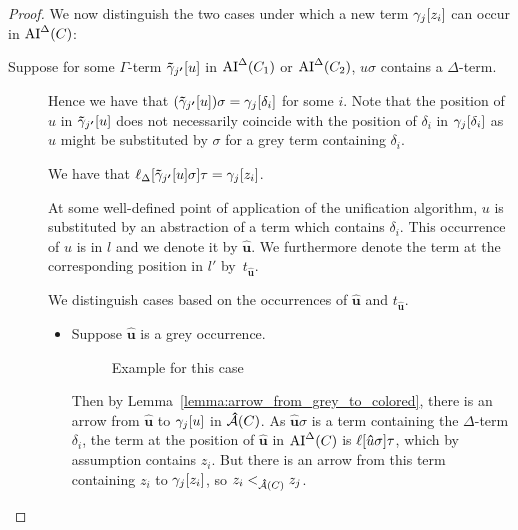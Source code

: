 \documentclass[,%
	paper=a4,%
	DIV10, %
	twoside=false,%
	liststotoc,
	bibtotoc,
	draft=false,%
	numbers=noendperiod
]{scrartcl}
\begin{document}
\begin{proof}
	We now distinguish the two cases under which a new term $\gamma_j[z_i]$ can occur in $\operatorname{AI}^\Delta(C)$:

	\begin{description}
		\item[Suppose for some $\Gamma$-term $\bm\tilde\gamma_{j\bm'}[u]$ in $\operatorname{AI}^\Delta(C_1)$ or $\operatorname{AI}^\Delta(C_2)$, $u\sigma$ contains a $\Delta$-term.]\hfill\nopagebreak

			Hence we have that $(\bm\tilde\gamma_{j\bm'}[u])\sigma = \gamma_j[\delta_i]$ for some $i$.
			Note that the position of $u$ in $\bm\tilde\gamma_{j\bm'}[u]$ does not necessarily coincide with the position of $\delta_i$ in $\gamma_j[\delta_i]$ as $u$ might be substituted by $\sigma$ for a grey term containing $\delta_i$.

			We have that $\ell_{\Delta}[\bm\tilde\gamma_{j\bm'}[u]\sigma]\tau = \gamma_j[z_i]$.

			\newcommand{\hatu}{{\bm\hat u}}
			\newcommand{\hatuPrime}{t_{\bm\hat u}}
			At some well-defined point of application of the unification algorithm, $u$ is substituted by an abstraction of a term which contains $\delta_i$. This occurrence of $u$ is in $l$ and we denote it by $\hatu$.
			We furthermore denote the term at the corresponding position in $l'$ by~$\hatuPrime$.

			We distinguish cases based on the occurrences of $\hatu$ and $\hatuPrime$.
			\begin{itemize}
				\item Suppose $\hatu$ is a grey occurrence.

					\begin{figure}[h]
						\begin{prooftree}
							\AxiomCm{C_1: P(\oldgam\occ{u}) \lor Q(\hatu)}
							\AxiomCm{C_2: \lnot Q(\hatuPrime)}
						\end{prooftree} 
						\caption{Example for this case}
					\end{figure}

					Then by Lemma~\ref{lemma:arrow_from_grey_to_colored}, there is an arrow from $\hatu$ to $\gamma_j[u]$ in $\operatorname{{\mathcal{\bm{\hat}A}}}(C)$.
					As $\hatu\sigma$ is a term containing the $\Delta$-term $\delta_i$, the term at the position of $\hatu$ in $\operatorname{AI}^\Delta(C)$ is $\lifboth{\hatu\sigma}\tau$, which by assumption contains $z_i$. 
					But there is an arrow from this term containing $z_i$ to $\gamma_j[z_i]$, so $z_i <_{\operatorname{{\mathcal{\bm{\hat}A}}}(C)} z_j$.


					\begin{comment}%
						As $\hatu$ and $\hatuPrime$ are at corresponding positions in the resolved literal, their arrows are merged, so it suffices to show that there is an arrow from a term containing an occurrence of $z_i$ to the position of $\hatuPrime$.


\end{comment}
\end{itemize}
\end{description}
\end{proof}
\end{document}

